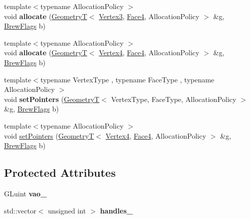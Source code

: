\begin{DoxyCompactItemize}
\item 
\hypertarget{classs9_1_1gl_1_1Drawable_a9df92ec26ccfddc5a49b9f440e62c69f}{{\footnotesize template$<$typename Allocation\-Policy $>$ }\\void {\bfseries allocate} (\hyperlink{classs9_1_1GeometryT}{\-Geometry\-T}$<$ \hyperlink{structs9_1_1VertexT}{\-Vertex3}, \hyperlink{structs9_1_1FaceT}{\-Face4}, \-Allocation\-Policy $>$ \&g, \hyperlink{structs9_1_1gl_1_1BrewFlags}{\-Brew\-Flags} b)}\label{classs9_1_1gl_1_1Drawable_a9df92ec26ccfddc5a49b9f440e62c69f}

\item 
\hypertarget{classs9_1_1gl_1_1Drawable_a6033b5801d330cd6fa2994fc8a77fab6}{{\footnotesize template$<$typename Allocation\-Policy $>$ }\\void {\bfseries allocate} (\hyperlink{classs9_1_1GeometryT}{\-Geometry\-T}$<$ \hyperlink{structs9_1_1VertexT}{\-Vertex4}, \hyperlink{structs9_1_1FaceT}{\-Face4}, \-Allocation\-Policy $>$ \&g, \hyperlink{structs9_1_1gl_1_1BrewFlags}{\-Brew\-Flags} b)}\label{classs9_1_1gl_1_1Drawable_a6033b5801d330cd6fa2994fc8a77fab6}

\item 
\hypertarget{classs9_1_1gl_1_1Drawable_a9cf81e2a6d53700488217b215a5d741f}{{\footnotesize template$<$typename Vertex\-Type , typename Face\-Type , typename Allocation\-Policy $>$ }\\void {\bfseries set\-Pointers} (\hyperlink{classs9_1_1GeometryT}{\-Geometry\-T}$<$ \-Vertex\-Type, \-Face\-Type, \-Allocation\-Policy $>$ \&g, \hyperlink{structs9_1_1gl_1_1BrewFlags}{\-Brew\-Flags} b)}\label{classs9_1_1gl_1_1Drawable_a9cf81e2a6d53700488217b215a5d741f}

\item 
{\footnotesize template$<$typename Allocation\-Policy $>$ }\\void \hyperlink{classs9_1_1gl_1_1Drawable_a82268b69a4127ccea73e20d14e9a4835}{set\-Pointers} (\hyperlink{classs9_1_1GeometryT}{\-Geometry\-T}$<$ \hyperlink{structs9_1_1VertexT}{\-Vertex4}, \hyperlink{structs9_1_1FaceT}{\-Face4}, \-Allocation\-Policy $>$ \&g, \hyperlink{structs9_1_1gl_1_1BrewFlags}{\-Brew\-Flags} b)
\end{DoxyCompactItemize}
\subsection*{\-Protected \-Attributes}
\begin{DoxyCompactItemize}
\item 
\hypertarget{classs9_1_1gl_1_1Drawable_af6cf679ad222fb978916db2d2123b6ad}{\-G\-Luint {\bfseries vao\-\_\-}}\label{classs9_1_1gl_1_1Drawable_af6cf679ad222fb978916db2d2123b6ad}

\item 
\hypertarget{classs9_1_1gl_1_1Drawable_a8fb7244c60f78807837526c482e8965b}{std\-::vector$<$ unsigned int $>$ {\bfseries handles\-\_\-}}\label{classs9_1_1gl_1_1Drawable_a8fb7244c60f78807837526c482e8965b}

\end{DoxyCompactItemize}


